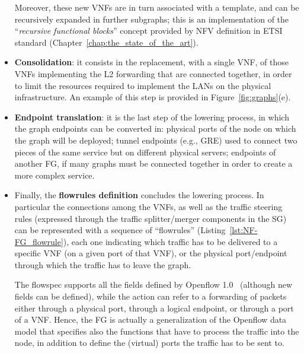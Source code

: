 \begin{itemize}
	Moreover, these new VNFs are in turn associated with a template, and can be recursively expanded in further subgraphs; this is an implementation of the ``\textit{recursive functional blocks}'' concept provided by NFV definition in ETSI standard (Chapter~\ref{chap:the_state_of_the_art}).
	\item \textbf{Consolidation}: it consists in the replacement, with a single VNF, of those VNFs implementing the L2 forwarding that are connected together, in order to limit the resources required to implement the LANs on the physical infrastructure.
	An example of this step is provided in Figure~\ref{fig:graphs}(e).
	\item \textbf{Endpoint translation}: it is the last step of the lowering process, in which the graph endpoints can be converted in: physical ports of the node on which the graph will be deployed; tunnel endpoints (e.g., GRE) used to connect two pieces of the same service but on different physical servers; endpoints of another FG, if many graphs must be connected together in order to create a more complex service.
	\item Finally, the \textbf{flowrules definition} concludes the lowering process. In particular the connections among the VNFs, as well as the traffic steering rules (expressed through the traffic splitter/merger components in the SG) can be represented with a sequence of ``flowrules'' (Listing~\ref{lst:NF-FG_flowrule}), each one indicating which traffic has to be delivered to a specific VNF (on a given port of that VNF), or the physical port/endpoint through which the traffic has to leave the graph. 
	
	
	
	
	The flowspec supports all the fields defined by Openflow 1.0~\cite{of10} (although new fields can be defined), while the action can refer to a forwarding of packets either through a physical port, through a logical endpoint, or through a port of a VNF. 
	Hence, the FG is actually a generalization of the Openflow data model that specifies also the functions that have to process the traffic into the node, in addition to define the (virtual) ports the traffic has to be sent to.
	
	
	
\end{itemize}










